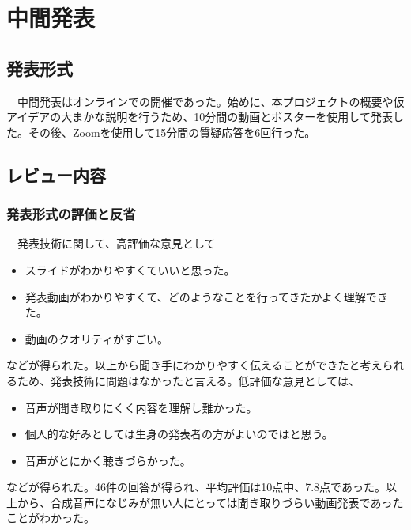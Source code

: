 \chapter{中間発表}

\section{発表形式}
　中間発表はオンラインでの開催であった。始めに、本プロジェクトの概要や仮アイデアの大まかな説明を行うため、10分間の動画とポスターを使用して発表した。その後、Zoomを使用して15分間の質疑応答を6回行った。

\section{レビュー内容}
\subsection{発表形式の評価と反省}
　発表技術に関して、高評価な意見として
\begin{itemize}
    \item スライドがわかりやすくていいと思った。
    \item 発表動画がわかりやすくて、どのようなことを行ってきたかよく理解できた。
    \item 動画のクオリティがすごい。
\end{itemize}
などが得られた。以上から聞き手にわかりやすく伝えることができたと考えられるため、発表技術に問題はなかったと言える。低評価な意見としては、
\begin{itemize}
    \item 音声が聞き取りにくく内容を理解し難かった。
    \item 個人的な好みとしては生身の発表者の方がよいのではと思う。
    \item 音声がとにかく聴きづらかった。
\end{itemize}
などが得られた。46件の回答が得られ、平均評価は10点中、7.8点であった。以上から、合成音声になじみが無い人にとっては聞き取りづらい動画発表であったことがわかった。

